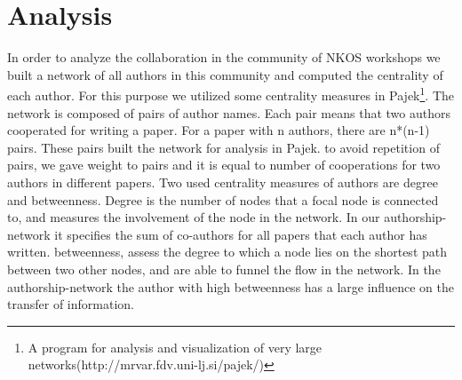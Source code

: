 \documentclass[runningheads,a4paper]{llncs}
\begin{document}
\section{Analysis}\label{analysis}
In order to analyze the collaboration in the community of NKOS workshops we built a network of all authors in this community and computed the centrality of each author. For this purpose we utilized some centrality measures in Pajek\footnote{A program for analysis and visualization of very large networks(http://mrvar.fdv.uni-lj.si/pajek/)}. The network is composed of pairs of author names. Each pair means that two authors cooperated for writing a paper. For a paper with n authors, there are n*(n-1) pairs. These pairs built the network for analysis in Pajek. to avoid repetition of pairs, we gave weight to pairs and it is equal to number of cooperations for two authors in different papers. 
Two used centrality measures of authors are degree and betweenness. Degree is the number of nodes that a focal node is connected to, and measures the involvement of the node in the network\cite{Opsahl2010}. In our authorship-network it specifies the sum of co-authors for all papers that each author has written. betweenness, assess the degree to which a node lies on the shortest path between two other nodes, and are able to funnel the flow in the network\cite{Opsahl2010}. In the authorship-network the author with high betweenness has a large influence on the transfer of information. 

\end{document}
